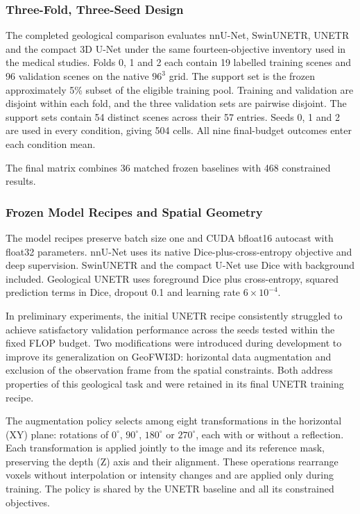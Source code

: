 \documentclass[12pt,a4paper]{article}
\begin{document}
\subsubsection{Three-Fold, Three-Seed Design}

The completed geological comparison evaluates nnU-Net, SwinUNETR,
UNETR and the compact 3D U-Net under the same fourteen-objective
inventory used in the medical studies. Folds 0, 1 and 2 each contain
19 labelled training scenes and 96 validation scenes on the native
$96^3$ grid. The support set is the frozen approximately 5\% subset
of the eligible training pool. Training and validation are disjoint
within each fold, and the three validation sets are pairwise disjoint.
The support sets contain 54 distinct scenes across their 57 entries.
Seeds 0, 1 and 2 are used in every condition, giving 504 cells.
All nine final-budget outcomes enter each condition mean.

The final matrix combines 36 matched frozen baselines with 468
constrained results. 

\subsubsection{Frozen Model Recipes and Spatial Geometry}

The model recipes preserve batch size one and CUDA bfloat16 autocast
with float32 parameters. nnU-Net uses its native Dice-plus-cross-entropy
objective and deep supervision. SwinUNETR and the compact U-Net use
Dice with background included. Geological UNETR uses foreground
Dice plus cross-entropy, squared prediction terms in Dice, dropout
0.1 and learning rate $6\times10^{-4}$.

In preliminary experiments, the initial UNETR recipe consistently struggled
to achieve satisfactory validation performance across the seeds tested
within the fixed FLOP budget. Two modifications were introduced during
development to improve its generalization on GeoFWI3D: horizontal data
augmentation and exclusion of the observation frame from the spatial
constraints. Both address properties of this geological task and were
retained in its final UNETR training recipe.

The augmentation policy selects among eight transformations in the
horizontal (XY) plane: rotations of $0^\circ$, $90^\circ$, $180^\circ$
or $270^\circ$, each with or without a reflection. Each transformation
is applied jointly to the image and its reference mask, preserving the
depth (Z) axis and their alignment. These operations rearrange voxels
without interpolation or intensity changes and are applied only during
training. The policy is shared by the UNETR baseline and all its
constrained objectives.
\end{document}
